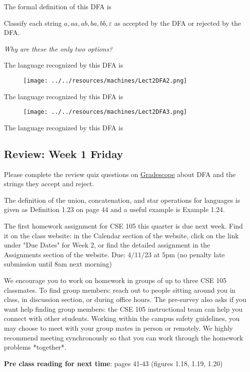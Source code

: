 \documentclass[12pt, oneside]{article}
\begin{document}
The formal definition of this DFA is
   
\vspace{100pt}
   

Classify each string $a, aa, ab, ba, bb, \varepsilon$ as accepted by the DFA or rejected by the DFA.  

{\it Why are these the only two options?}

\vspace{200pt}


The language recognized by this DFA is
  
\vspace{100pt}
   

\begin{figure}[h]
  \centering
  \texttt{[image: ../../resources/machines/Lect2DFA2.png]} 
\end{figure}
   

The language recognized by this DFA is
  
\vspace{100pt}

\begin{figure}[h]
    \centering
    \texttt{[image: ../../resources/machines/Lect2DFA3.png]} 
\end{figure}

The language recognized by this DFA is
  
\vspace{100pt}
 

\newpage

\subsection*{Review: Week 1 Friday}

Please complete the review quiz questions on \href{http://gradescope.com}{Gradescope} about 
DFA and the strings they accept and reject.

The definition of the union, concatenation, and star operations for languages is given 
as Definition 1.23 on page 44 and a useful example is Example 1.24.


The first homework assignment for CSE 105 this quarter is due next week. 
Find it on the class website: in the Calendar section of the website, click on the link under "Due Dates" for Week 2, or find
the detailed assignment in the Assignments section of the website.
Due: 4/11/23 at 5pm (no penalty late submission until 8am next morning)

We encourage you to work on homework in groups of up to three CSE 105 classmates. 
To find group members: reach out to people sitting around you in class, in discussion section, 
or during office hours. The pre-survey also asks if you want help finding group members: 
the CSE 105 instructional team can help you connect with other students. Working within the 
campus safety guidelines, you may choose to meet with your group mates in person or remotely. 
We highly recommend meeting synchronously so that you can work through the homework problems *together*. 

{\bf Pre class reading for next time}: pages 41-43 (figures 1.18, 1.19, 1.20)
\end{document}
